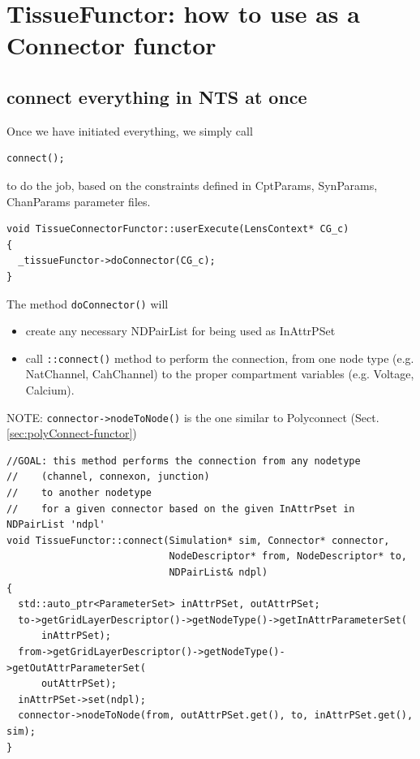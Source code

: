 \section{TissueFunctor: how to use as a Connector functor}
\label{sec:TissueFunctor-as-connector-functor}


\subsection{connect everything in NTS at once}

Once we have initiated everything, we simply call
\begin{verbatim}
connect();
\end{verbatim}
to do the job, based on the constraints defined in CptParams, SynParams,
ChanParams parameter files.


\begin{verbatim}
void TissueConnectorFunctor::userExecute(LensContext* CG_c) 
{
  _tissueFunctor->doConnector(CG_c);
}

\end{verbatim}
% 

The method \verb!doConnector()! will 
\begin{itemize}
  \item create any necessary NDPairList for being used as InAttrPSet
  
  \item call \verb!::connect()! method to perform the connection, from one node
  type (e.g. NatChannel, CahChannel) to the proper compartment variables (e.g.
  Voltage, Calcium).
\end{itemize}


NOTE: \verb!connector->nodeToNode()! is the one similar to Polyconnect
(Sect.\ref{sec:polyConnect-functor})

\begin{verbatim}
//GOAL: this method performs the connection from any nodetype
//    (channel, connexon, junction)
//    to another nodetype
//    for a given connector based on the given InAttrPset in NDPairList 'ndpl'
void TissueFunctor::connect(Simulation* sim, Connector* connector,
                            NodeDescriptor* from, NodeDescriptor* to,
                            NDPairList& ndpl)
{
  std::auto_ptr<ParameterSet> inAttrPSet, outAttrPSet;
  to->getGridLayerDescriptor()->getNodeType()->getInAttrParameterSet(
      inAttrPSet);
  from->getGridLayerDescriptor()->getNodeType()->getOutAttrParameterSet(
      outAttrPSet);
  inAttrPSet->set(ndpl);
  connector->nodeToNode(from, outAttrPSet.get(), to, inAttrPSet.get(), sim);
}
\end{verbatim}

